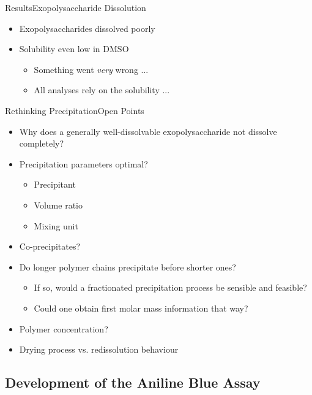 \documentclass[mathserif]{beamer}
\newcommand{\EPS}{Exopolysaccharide}
\newcommand{\eps}{exopolysaccharide}
\begin{document}
\begin{frame}{Results}{\EPS{} Dissolution}
	\begin{itemize}
		\item \EPS{}s dissolved poorly
		\pause
		\item Solubility even low in DMSO
		\pause
			\begin{itemize}
				\item Something went \textit{very} wrong ...
				\pause
				\item All analyses rely on the solubility ...
			\end{itemize}
	\end{itemize}
\end{frame}

\begin{frame}{Rethinking Precipitation}{Open Points}
	\begin{itemize}
		\item Why does a generally well-dissolvable \eps{} not dissolve completely?
		\pause
		\item Precipitation parameters optimal?
			\begin{itemize}
				\item Precipitant
				\item Volume ratio
				\item Mixing unit
			\end{itemize}
		\pause
		\item Co-precipitates?
		\pause
		\item Do longer polymer chains precipitate before shorter ones?
			\begin{itemize}
				\item If so, would a fractionated precipitation process be sensible and feasible?
				\item Could one obtain first molar mass information that way?
			\end{itemize}
		\pause
		\item Polymer concentration?
		\pause
		\item Drying process vs. redissolution behaviour
	\end{itemize}
\end{frame}

\subsection{Development of the Aniline Blue Assay}
\end{document}
